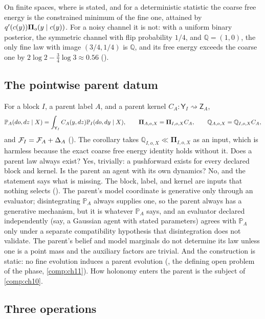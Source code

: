 On finite spaces, where  is stated, and for a deterministic statistic
the coarse free energy is the constrained minimum of the fine one, attained by $q'(c(y))\boldsymbol\Pi_o(y\mid c(y))$. For a noisy channel it is not: with a uniform
binary posterior, the symmetric channel with flip probability $1/4$, and $\mathbb Q=(1,0)$, the only fine
law with image $(3/4,1/4)$ is $\mathbb Q$, and its free energy exceeds the coarse one by
$2\log2-\frac34\log3\approx0.56$ ().

\subsection{The pointwise parent datum}

For a block $I$, a parent label $A$, and a parent kernel $C_A:\mathsf Y_I\rightsquigarrow\mathsf Z_A$,
\[
\mathbb P_A(do,dz\mid X)=\int_{\mathsf Y_I}C_A(y,dz)\mathbb P_I(do,dy\mid X),
\qquad
\boldsymbol\Pi_{A,o,X}=\boldsymbol\Pi_{I,o,X}C_A,
\qquad
\mathbb Q_{A,o,X}=\mathbb Q_{I,o,X}C_A,
\]
and $\mathcal F_I=\mathcal F_A+\Delta_A$ (). The corollary takes
$\mathbb Q_{I,o,X}\ll\boldsymbol\Pi_{I,o,X}$ as an input, which is harmless because the exact coarse free
energy identity holds without it. Does a parent law always
exist? Yes, trivially: a pushforward exists for every declared block and kernel. Is the parent an agent
with its own dynamics? No, and the statement says what is missing. The block, label, and kernel are
inputs that nothing selects (). The parent's model coordinate is generative
only through an evaluator; disintegrating $\mathbb P_A$ always supplies one, so the parent always has a
generative mechanism, but it is whatever $\mathbb P_A$ says, and an evaluator declared independently
(say, a Gaussian agent with stated parameters) agrees with $\mathbb P_A$ only under a separate
compatibility hypothesis that disintegration does not validate. The parent's belief and model marginals
do not determine its law unless one is a point mass and the auxiliary factors are trivial. And the
construction is static: no fine evolution induces a parent evolution
(, the defining open problem of the phase, \cref{comp:ch11}).
How holonomy enters the parent is the subject of \cref{comp:ch10}.

\subsection{Three operations}

